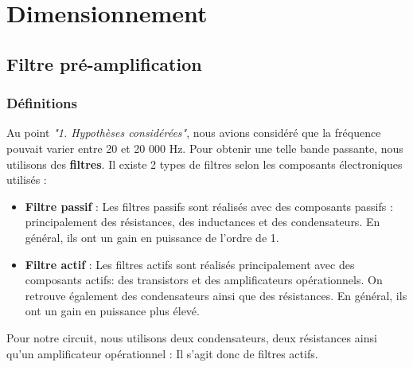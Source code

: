 \documentclass[10pt, oneside, a4paper]{article}
\begin{document}
\section{Dimensionnement}

\subsection{Filtre pré-amplification}
\subsubsection{Définitions}
Au point \textit{"1. Hypothèses considérées"}, nous avions considéré que la fréquence pouvait varier entre 20 et 20 000 Hz. Pour obtenir une telle bande passante, nous utilisons des \textbf{filtres}. Il existe 2 types de filtres selon les composants électroniques utilisés : 
\begin{itemize}
\item \textbf{Filtre passif} : Les filtres passifs sont réalisés avec des composants passifs : principalement des résistances, des inductances et des condensateurs. En général, ils ont un gain en puissance de l'ordre de 1.
\item \textbf{Filtre actif} : Les filtres actifs sont réalisés principalement avec des composants actifs: des transistors et des amplificateurs opérationnels. On retrouve également des condensateurs ainsi que des résistances. En général, ils ont un gain en puissance plus élevé.
\end{itemize}
Pour notre circuit, nous utilisons deux condensateurs, deux résistances ainsi qu'un amplificateur opérationnel : Il s'agit donc de filtres actifs. 
\end{document}
